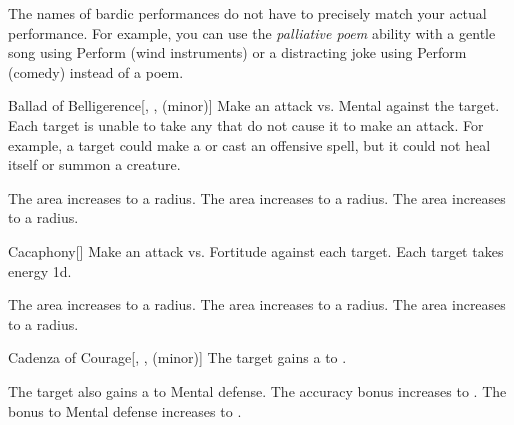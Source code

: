         The names of bardic performances do not have to precisely match your actual performance.
        For example, you can use the \textit{palliative poem} ability with a gentle song using Perform (wind instruments) or a distracting joke using Perform (comedy) instead of a poem.
        {
            \begin{freeability}{Ballad of Belligerence}[, ,  (minor)]
                Make an attack vs. Mental against the target.
                \hit Each target is unable to take any  that do not cause it to make an attack.
                For example, a target could make a  or cast an offensive spell, but it could not heal itself or summon a creature.

                \rankline
                 The area increases to a \areamed radius.
                 The area increases to a \arealarge radius.
                 The area increases to a \areahuge radius.
            \end{freeability}

            \begin{freeability}{Cacaphony}[]
                Make an attack vs. Fortitude against each target.
                \hit Each target takes energy  \minus1d.

                \rankline
                 The area increases to a \areamed radius.
                 The area increases to a \arealarge radius.
                 The area increases to a \areahuge radius.
            \end{freeability}

            \begin{freeability}{Cadenza of Courage}[, ,  (minor)]
                The target gains a   to .

                \rankline
                 The target also gains a   to Mental defense.
                 The accuracy bonus increases to .
                 The bonus to Mental defense increases to .
            \end{freeability}

}
